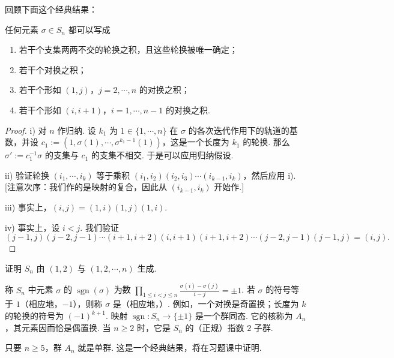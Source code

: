 回顾下面这个经典结果：

\begin{proposition*}
任何元素 $\sigma\in S_n$ 都可以写成
\begin{enumerate}[label=\roman*)]
\item 若干个支集两两不交的轮换之积，且这些轮换被唯一确定；
\item 若干个对换之积；
\item 若干个形如 $(1,j)$，$j=2,\cdots,n$ 的对换之积；
\item 若干个形如 $(i,i+1)$，$i=1,\cdots,n-1$ 的对换之积.
\end{enumerate}
\end{proposition*}

\begin{proof}
i) 对 $n$ 作归纳. 设 $k_1$ 为 $1\in\{1,\cdots,n\}$ 在 $\sigma$ 的各次迭代作用下的轨道的基数，并设 $c_1:=(1,\sigma(1),\cdots,\sigma^{k_1-1}(1))$，这是一个长度为 $k_1$ 的轮换. 那么 $\sigma':=c_1^{-1}\sigma$ 的支集与 $c_1$ 的支集不相交. 于是可以应用归纳假设.

ii) 验证轮换 $(i_1,\cdots,i_k)$ 等于乘积 $(i_1,i_2)(i_2,i_3)\cdots(i_{k-1},i_k)$，然后应用 i). [注意次序：我们作的是映射的复合，因此从 $(i_{k-1},i_k)$ 开始作.]

iii) 事实上，$(i,j)=(1,i)(1,j)(1,i)$.

iv) 事实上，设 $i<j$. 我们验证
\[
(j-1,j)(j-2,j-1)\cdots(i+1,i+2)(i,i+1)(i+1,i+2)\cdots(j-2,j-1)(j-1,j)=(i,j).
\]
\end{proof}

\begin{exercise*}
证明 $S_n$ 由 $(1,2)$ 与 $(1,2,\cdots,n)$ 生成.
\end{exercise*}

称 $S_n$ 中元素 $\sigma$ 的 $\operatorname{sgn}(\sigma)$ 为数 $\prod_{1\le i<j\le n}\frac{\sigma(i)-\sigma(j)}{i-j}=\pm 1$. 若 $\sigma$ 的符号等于 $1$（相应地，$-1$），则称 $\sigma$ 是（相应地，）. 例如，一个对换是奇置换；长度为 $k$ 的轮换的符号为 $(-1)^{k+1}$. 映射 $\operatorname{sgn}:S_n\to\{\pm1\}$ 是一个群同态. 它的核称为 $A_n$，其元素因而恰是偶置换. 当 $n\ge 2$ 时，它是 $S_n$ 的（正规）指数 $2$ 子群.

\begin{remark*}
只要 $n\ge 5$，群 $A_n$ 就是单群. 这是一个经典结果，将在习题课中证明.
\end{remark*}
